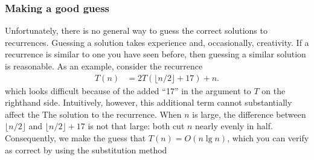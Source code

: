 \documentclass{report}
\begin{document}
        \bigbreak \noindent 
        \subsubsection{Making a good guess}
        \bigbreak \noindent 
        Unfortunately, there is no general way to guess the correct solutions to recurrences. Guessing a solution takes experience and, occasionally, creativity.
        \bigbreak \noindent 
        If a recurrence is similar to one you have seen before, then guessing a similar solution is reasonable. As an example, consider the recurrence
        \begin{align*}
            T(n) &= 2T\left(\lfloor n/2\rfloor + 17 \right) + n
        .\end{align*}
        \bigbreak \noindent 
        which looks difficult because of the added “17” in the argument to $T$ on the righthand side. Intuitively, however, this additional term cannot substantially affect the
        \bigbreak \noindent 
        The solution to the recurrence. When \( n \) is large, the difference between \( \lfloor n/2 \rfloor \) and \( \lfloor n/2 \rfloor + 17 \) is not that large: both cut \( n \) nearly evenly in half. Consequently, we make the guess that $T(n) = O(n \lg n)$, which you can verify as correct by using the substitution method

        \bigbreak \noindent 
\end{document}
